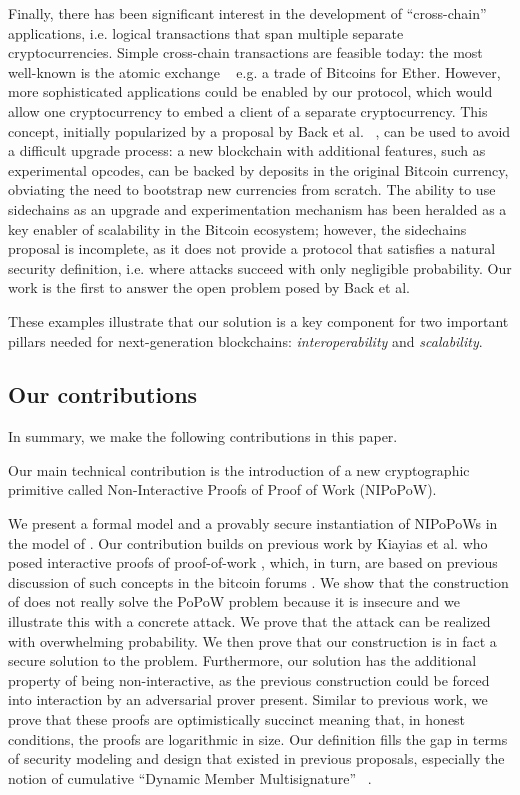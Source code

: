 Finally, there has been significant interest in the development of
``cross-chain'' applications, i.e. logical transactions that span multiple
separate cryptocurrencies. Simple cross-chain transactions are feasible today:
the most well-known is the atomic exchange ~\cite{tiernolan} e.g. a trade of
Bitcoins for Ether. However, more sophisticated applications could be enabled
by our protocol, which would allow one cryptocurrency to embed a client of a
separate cryptocurrency. This concept, initially popularized by a proposal by
Back et al. ~\cite{sidechains}, can be used to avoid a difficult
upgrade process: a new blockchain with additional features, such as
experimental opcodes, can be backed by deposits in the original Bitcoin
currency, obviating the need to bootstrap new currencies from scratch. The
ability to use sidechains as an upgrade and experimentation mechanism
has been heralded as a key enabler of scalability in the Bitcoin ecosystem;
however, the sidechains proposal is incomplete, as it does not provide a
protocol that satisfies a natural security definition, i.e. where attacks
succeed with only negligible probability. Our work is the first to answer the
open problem posed by Back et al.

These examples illustrate that our solution is a key component for two important
pillars needed for next-generation blockchains: \textit{interoperability} and
\textit{scalability}.

\subsection{Our contributions}

In summary, we make the following contributions in this paper.

Our main technical contribution is the introduction of a new cryptographic
primitive called Non-Interactive Proofs of Proof of Work (NIPoPoW).

We present a formal model and a provably secure instantiation of NIPoPoWs in the
model of \cite{backbone}. Our contribution builds on previous work by Kiayias et
al. who posed interactive proofs of proof-of-work \cite{KLS}, which, in turn,
are based on previous discussion of such concepts in the bitcoin forums
\cite{highway}. We show that the construction of \cite{KLS} does not really
solve the PoPoW problem because it is insecure and we illustrate this with a
concrete attack. We prove that the attack can be realized with overwhelming
probability. We then prove that our construction is in fact a secure solution to
the problem. Furthermore, our solution has the additional property of being
non-interactive, as the previous construction could be forced into interaction
by an adversarial prover present. Similar to previous work, we prove that these
proofs are optimistically succinct meaning that, in honest conditions, the
proofs are logarithmic in size. Our definition fills the gap in terms of
security modeling and design that existed in previous proposals, especially the
notion of cumulative ``Dynamic Member Multisignature'' ~\cite{sidechains}.

